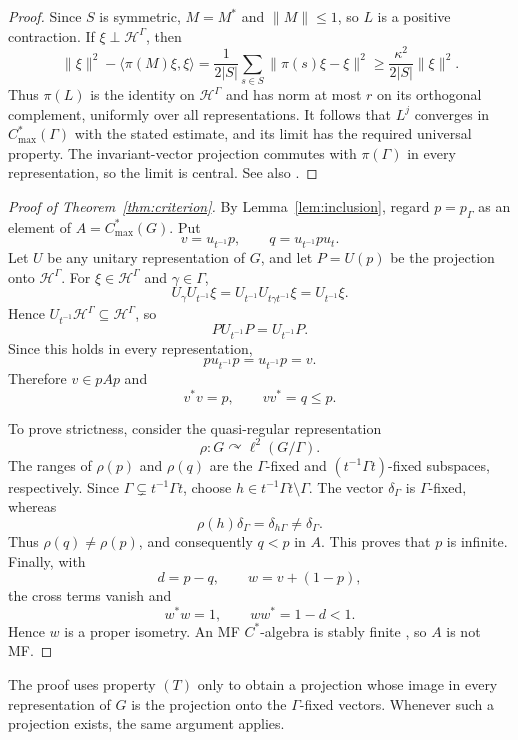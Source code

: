 \documentclass[11pt]{article}
\newcommand{\Hh}{\mathcal H}
\newcommand{\Cmax}[1]{C^*_{\max}(#1)}
\begin{document}
\begin{proof}
Since $S$ is symmetric, $M=M^*$ and $\|M\|\leq1$, so $L$ is a positive
contraction.  If $\xi\perp\Hh^\Gamma$, then
\[
 \|\xi\|^2-\langle\pi(M)\xi,\xi\rangle
 =\frac1{2|S|}\sum_{s\in S}\|\pi(s)\xi-\xi\|^2
 \geq\frac{\kappa^2}{2|S|}\|\xi\|^2.
\]
Thus $\pi(L)$ is the identity on $\Hh^\Gamma$ and has norm at most $r$
on its orthogonal complement, uniformly over all representations.  It follows
that $L^j$ converges in $\Cmax\Gamma$ with the stated estimate, and its
limit has the required universal property.  The invariant-vector projection
commutes with $\pi(\Gamma)$ in every representation, so the limit is central.
See also \cite{DrutuNowak}.
\end{proof}

\begin{proof}[Proof of Theorem~\ref{thm:criterion}]
By Lemma~\ref{lem:inclusion}, regard $p=p_\Gamma$ as an element of
$A=\Cmax G$.  Put
\[
 v=u_{t^{-1}}p,
 \qquad
 q=u_{t^{-1}}pu_t.
\]
Let $U$ be any unitary representation of $G$, and let $P=U(p)$ be the
projection onto $\Hh^\Gamma$.  For $\xi\in\Hh^\Gamma$ and
$\gamma\in\Gamma$,
\[
 U_\gamma U_{t^{-1}}\xi
 =U_{t^{-1}}U_{t\gamma t^{-1}}\xi
 =U_{t^{-1}}\xi.
\]
Hence $U_{t^{-1}}\Hh^\Gamma\subseteq\Hh^\Gamma$, so
\[
 P U_{t^{-1}}P=U_{t^{-1}}P.
\]
Since this holds in every representation,
\[
 p u_{t^{-1}}p=u_{t^{-1}}p=v.
\]
Therefore $v\in pAp$ and
\[
 v^*v=p,
 \qquad
 vv^*=q\leq p.
\]

To prove strictness, consider the quasi-regular representation
\[
 \rho:G\curvearrowright\ell^2(G/\Gamma).
\]
The ranges of $\rho(p)$ and $\rho(q)$ are the $\Gamma$-fixed and
$(t^{-1}\Gamma t)$-fixed subspaces, respectively.  Since
$\Gamma\subsetneq t^{-1}\Gamma t$, choose
$h\in t^{-1}\Gamma t\setminus\Gamma$.  The vector $\delta_\Gamma$ is
$\Gamma$-fixed, whereas
\[
 \rho(h)\delta_\Gamma=\delta_{h\Gamma}\neq\delta_\Gamma.
\]
Thus $\rho(q)\neq\rho(p)$, and consequently $q<p$ in $A$.  This proves
that $p$ is infinite.  Finally, with
\[
 d=p-q,
 \qquad
 w=v+(1-p),
\]
the cross terms vanish and
\[
 w^*w=1,
 \qquad
 ww^*=1-d<1.
\]
Hence $w$ is a proper isometry.  An MF $C^*$-algebra is stably finite
\cite{BlackadarKirchberg}, so $A$ is not MF.
\end{proof}

The proof uses property $(T)$ only to obtain a projection whose image in
every representation of $G$ is the projection onto the $\Gamma$-fixed
vectors.  Whenever such a projection exists, the same argument applies.
\end{document}
